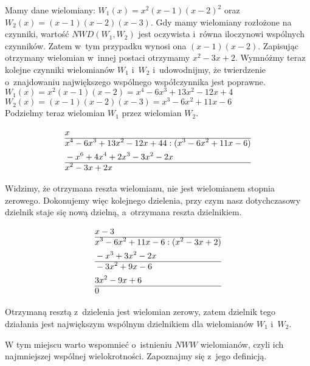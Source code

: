 \begin{example}
	$ $\\
	Mamy dane wielomiany: $W_1(x) = x^2(x-1)(x-2)^2$ oraz $W_2(x) = (x-1)(x-2)(x-3)$. Gdy mamy wielomiany rozłożone na czynniki, wartość $NWD(W_1, W_2)$ jest oczywista i~równa iloczynowi wspólnych czynników. Zatem w~tym przypadku wynosi ona $(x-1)(x-2)$. Zapisując otrzymany wielomian w~innej postaci otrzymamy $x^2-3x+2$. Wymnóżmy teraz kolejne czynniki wielomianów $W_1$ i~$W_2$ i~udowodnijmy, że twierdzenie o~znajdowaniu największego wspólnego współczynnika jest poprawne. \\
	$W_1(x) = x^2(x-1)(x-2) = x^4-6x^3+13x^2-12x+4$ \\
	$W_2(x) = (x-1)(x-2)(x-3) = x^3-6x^2+11x-6$ \\
	Podzielmy teraz wielomian $W_1$ przez wielomian $W_2$.
	
	\begin{equation*}
	\begin{split}
&x\\\hline
&x^4-6x^3+13x^2-12x+44 : (x^3-6x^2+11x-6) \\
&-x^6+4x^4+2x^3-3x^2-2x \\\hline
&x^2-3x+2x
	\end{split}
	\end{equation*}
	
	Widzimy, że otrzymana reszta wielomianu, nie jest wielomianem stopnia zerowego. Dokonujemy więc kolejnego dzielenia, przy czym nasz dotychczasowy dzielnik staje się nową dzielną, a~otrzymana reszta dzielnikiem.
	
	\begin{equation*}
	\begin{split}
	&x-3\\\hline
	&x^3-6x^2+11x-6 : (x^2-3x+2) \\
	&-x^3+3x^2-2x \\\hline
	&-3x^2+9x-6 \\
	&3x^2-9x+6  \\\hline
	&0
	\end{split}
	\end{equation*}
	
	Otrzymaną resztą z~dzielenia jest wielomian zerowy, zatem dzielnik tego działania jest największym wspólnym dzielnikiem dla wielomianów $W_1$ i~$W_2$.
\end{example}

W tym miejscu warto wspomnieć o~istnieniu $NWW$ wielomianów, czyli ich najmniejszej wspólnej wielokrotności. Zapoznajmy się z~jego definicją.

